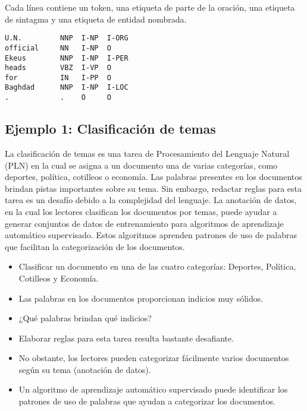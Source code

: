 Cada línea contiene un token, una etiqueta de parte de la oración, una etiqueta de sintagma y una etiqueta de entidad nombrada.
\begin{center}
\begin{verbatim}
U.N.         NNP  I-NP  I-ORG
official     NN   I-NP  O
Ekeus        NNP  I-NP  I-PER
heads        VBZ  I-VP  O
for          IN   I-PP  O
Baghdad      NNP  I-NP  I-LOC
.            .    O     O
\end{verbatim}
\end{center}



\subsection{Ejemplo 1: Clasificación de temas}

La clasificación de temas es una tarea de Procesamiento del Lenguaje Natural (PLN) en la cual se asigna a un documento una de varias categorías, como deportes, política, cotilleos o economía. Las palabras presentes en los documentos brindan pistas importantes sobre su tema. Sin embargo, redactar reglas para esta tarea es un desafío debido a la complejidad del lenguaje. La anotación de datos, en la cual los lectores clasifican los documentos por temas, puede ayudar a generar conjuntos de datos de entrenamiento para algoritmos de aprendizaje automático supervisado. Estos algoritmos aprenden patrones de uso de palabras que facilitan la categorización de los documentos.

\begin{itemize}
\item Clasificar un documento en una de las cuatro categorías: Deportes, Política, Cotilleos y Economía.
\item Las palabras en los documentos proporcionan indicios muy sólidos.
\item ¿Qué palabras brindan qué indicios?
\item Elaborar reglas para esta tarea resulta bastante desafiante.
\item No obstante, los lectores pueden categorizar fácilmente varios documentos según su tema (anotación de datos).
\item Un algoritmo de aprendizaje automático supervisado puede identificar los patrones de uso de palabras que ayudan a categorizar los documentos.
\end{itemize}


